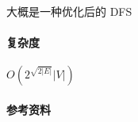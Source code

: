 大概是一种优化后的 DFS

\paragraph{复杂度} \(O\left(2^{\sqrt{2|E|}}|V|\right)\)

\paragraph{参考资料} \cite{yoichi2012exponential}